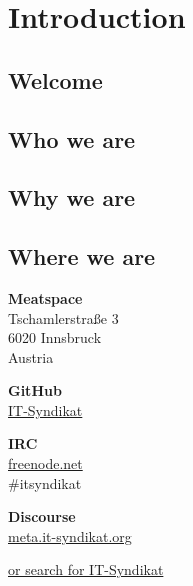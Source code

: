 \chapter{Introduction}
\label{cha:introduction}

\section{Welcome}
\label{sec:welcome}

\lipsum[1]

\section{Who we are}
\label{sec:who_we_are}

\lipsum[2]

\section{Why we are}
\label{sec:why_we_are}

\lipsum[2]

\section{Where we are}
\label{sec:where_we_are}

\begin{multicols}{2}
    \faHome{} \textbf{Meatspace}\\
    Tschamlerstraße 3\\
    6020 Innsbruck\\
    Austria

    \faGithub{} \textbf{GitHub}\\
    \href{https://github.com/it-syndikat}{IT-Syndikat}

    \columnbreak

    \faSlack{} \textbf{IRC}\\
    \href{https://freenode.net}{freenode.net}\\
    \#itsyndikat

    \faBullhorn{} \textbf{Discourse}\\
    \href{https://meta.it-syndikat.org}{meta.it-syndikat.org}
\end{multicols}

\faSearch{}
\href{https://duckduckgo.com/?q=IT-Syndikat}{or search for IT-Syndikat}
